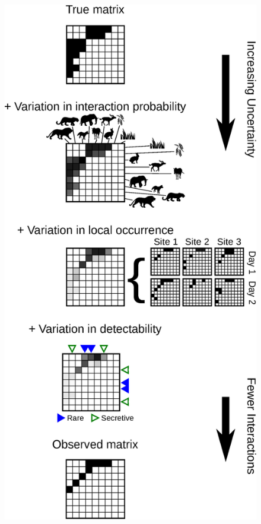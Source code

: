 \documentclass[12pt]{article}
\begin{document}
\begin{figure}[h!]
\begin{center}
    \includegraphics*[height=.45\textheight]{figures/conceptual_fig.eps}
    \end{center}
    \end{figure}
\end{document}
